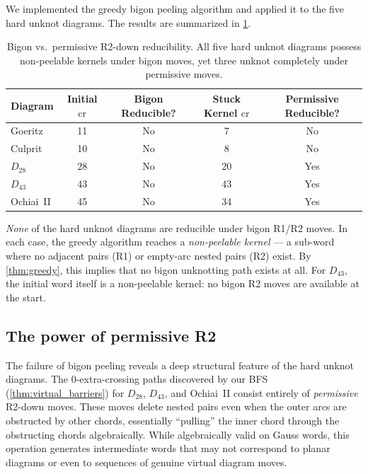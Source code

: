 \documentclass[a4paper,UKenglish,cleveref,autoref]{lipics-v2021}
\begin{document}
We implemented the greedy bigon peeling algorithm and applied it to the five hard unknot diagrams.
The results are summarized in \cref{tab:bigon}.

\begin{table}
\caption{Bigon vs.\ permissive R2-down reducibility. All five hard unknot diagrams possess non-peelable kernels under bigon moves, yet three unknot completely under permissive moves.}
\label{tab:bigon}
\begin{center}
\begin{tabular}{lcccc}
\toprule
Diagram & Initial $\mathrm{cr}$ & Bigon Reducible? & Stuck Kernel $\mathrm{cr}$ & Permissive Reducible? \\
\midrule
Goeritz & 11 & No & 7 & No \\
Culprit & 10 & No & 8 & No \\
$D_{28}$ & 28 & No & 20 & Yes \\
$D_{43}$ & 43 & No & 43 & Yes \\
Ochiai~II & 45 & No & 34 & Yes \\
\bottomrule
\end{tabular}
\end{center}
\end{table}

\emph{None} of the hard unknot diagrams are reducible under bigon R1/R2 moves.
In each case, the greedy algorithm reaches a \emph{non-peelable kernel} --- a sub-word where no adjacent pairs (R1) or empty-arc nested pairs (R2) exist.
By \cref{thm:greedy}, this implies that no bigon unknotting path exists at all.
For $D_{43}$, the initial word itself is a non-peelable kernel: no bigon R2 moves are available at the start.

\subsection{The power of permissive R2}

The failure of bigon peeling reveals a deep structural feature of the hard unknot diagrams.
The $0$-extra-crossing paths discovered by our BFS (\cref{thm:virtual_barriers}) for $D_{28}$, $D_{43}$, and Ochiai~II consist entirely of \emph{permissive} R2-down moves.
These moves delete nested pairs even when the outer arcs are obstructed by other chords, essentially ``pulling'' the inner chord through the obstructing chords algebraically.
While algebraically valid on Gauss words, this operation generates intermediate words that may not correspond to planar diagrams or even to sequences of genuine virtual diagram moves.
\end{document}

